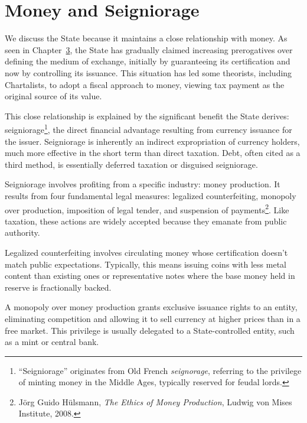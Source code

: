 \documentclass[
  a5paper,
  smalldemyvopaper,10pt,twoside,onecolumn,openright,extrafontsizes,hidelinks]{memoir}
\begin{document}
\section*{Money and Seigniorage}\label{la-monnaie-et-le-seigneuriage}


We discuss the State because it maintains a close relationship with
money. As seen in Chapter~\hyperref[ch:monnaie]{3}, the State has
gradually claimed increasing prerogatives over defining the medium of
exchange, initially by guaranteeing its certification and now by
controlling its issuance. This situation has led some theorists,
including Chartalists, to adopt a fiscal approach to money, viewing tax
payment as the original source of its value.

This close relationship is explained by the significant benefit the
State derives: seigniorage\footnote{``Seigniorage'' originates from Old
  French \emph{seignorage}, referring to the privilege of minting money
  in the Middle Ages, typically reserved for feudal lords.}, the direct
financial advantage resulting from currency issuance for the issuer.
Seigniorage is inherently an indirect expropriation of currency holders,
much more effective in the short term than direct taxation. Debt, often
cited as a third method, is essentially deferred taxation or disguised
seigniorage.

Seigniorage involves profiting from a specific industry: money
production. It results from four fundamental legal measures: legalized
counterfeiting, monopoly over production, imposition of legal tender,
and suspension of payments\footnote{Jörg Guido Hülsmann, \emph{The
  Ethics of Money Production}, Ludwig von Mises Institute, 2008.}. Like
taxation, these actions are widely accepted because they emanate from
public authority.

Legalized counterfeiting involves circulating money whose certification
doesn't match public expectations. Typically, this means issuing coins
with less metal content than existing ones or representative notes where
the base money held in reserve is fractionally backed.

A monopoly over money production grants exclusive issuance rights to an
entity, eliminating competition and allowing it to sell currency at
higher prices than in a free market. This privilege is usually delegated
to a State-controlled entity, such as a mint or central bank.
\end{document}
